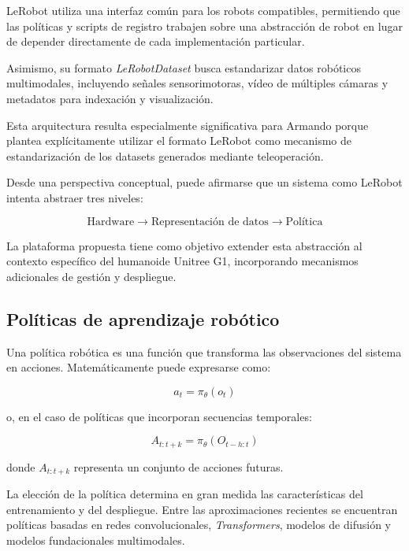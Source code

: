 \documentclass[stu,12pt,floatsintext]{apa7}
\begin{document}
LeRobot utiliza una interfaz común para los robots compatibles, permitiendo que las políticas y scripts de registro trabajen sobre una abstracción de robot en lugar de depender directamente de cada implementación particular.

Asimismo, su formato \textit{LeRobotDataset} busca estandarizar datos robóticos multimodales, incluyendo señales sensorimotoras, vídeo de múltiples cámaras y metadatos para indexación y visualización.

Esta arquitectura resulta especialmente significativa para Armando porque plantea explícitamente utilizar el formato LeRobot como mecanismo de estandarización de los datasets generados mediante teleoperación.

Desde una perspectiva conceptual, puede afirmarse que un sistema como LeRobot intenta abstraer tres niveles:

\begin{equation}
\text{Hardware}
\rightarrow
\text{Representación de datos}
\rightarrow
\text{Política}
\end{equation}

La plataforma propuesta tiene como objetivo extender esta abstracción al contexto específico del humanoide Unitree G1, incorporando mecanismos adicionales de gestión y despliegue.

\subsection{Políticas de aprendizaje robótico}

Una política robótica es una función que transforma las observaciones del sistema en acciones. Matemáticamente puede expresarse como:

\begin{equation}
a_t = \pi_{\theta}(o_t)
\end{equation}

o, en el caso de políticas que incorporan secuencias temporales:

\begin{equation}
A_{t:t+k} = \pi_{\theta}(O_{t-h:t})
\end{equation}

donde $A_{t:t+k}$ representa un conjunto de acciones futuras.

La elección de la política determina en gran medida las características del entrenamiento y del despliegue. Entre las aproximaciones recientes se encuentran políticas basadas en redes convolucionales, \textit{Transformers}, modelos de difusión y modelos fundacionales multimodales.
\end{document}
